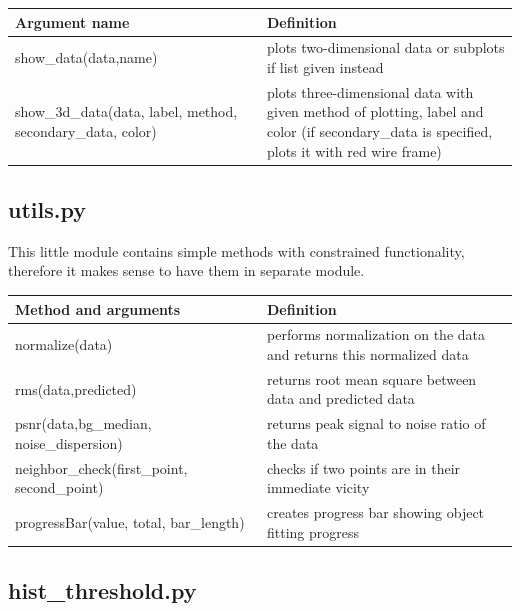 \documentclass[12pt, a4paper, oneside]{book}
\begin{document}
\begin{center}
    \begin{tabular}  { | p{0.5\linewidth} | p{0.5\linewidth} | }
        \hline
        Argument name & Definition \\
        \hline
        show\_data(data,name) & plots two-dimensional data or subplots if list given instead \\
        \hline
        show\_3d\_data(data, label, method, secondary\_data, color) & plots three-dimensional data with given method of plotting, label and color (if secondary\_data is specified, plots it with red wire frame) \\
        \hline
    \end{tabular}
\end{center}

\subsection{utils.py}

This little module contains simple methods with constrained functionality, therefore it makes sense to have them in separate module.

\begin{center}
    \begin{tabular}  { | p{0.5\linewidth} | p{0.5\linewidth} | }
        \hline
        Method and arguments & Definition \\
        \hline
        normalize(data) & performs normalization on the data and returns this normalized data \\
        \hline
        rms(data,predicted) & returns root mean square between data and predicted data \\
        \hline
        psnr(data,bg\_median, noise\_dispersion) & returns peak signal to noise ratio of the data \\
        \hline
        neighbor\_check(first\_point, second\_point) & checks if two points are in their immediate vicity \\
        \hline
        progressBar(value, total, bar\_length) & creates progress bar showing object fitting progress \\
        \hline
    \end{tabular}
\end{center}

\subsection{hist\_threshold.py}
\end{document}
